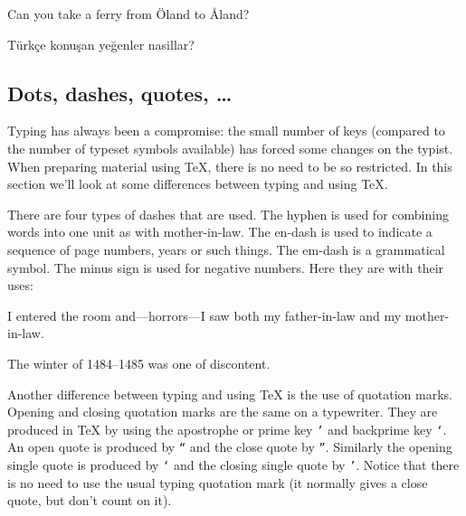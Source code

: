 \exercise Can you take a ferry from \"Oland to \AA land? 

\exercise T\"urk\c ce konu\c san ye\u genler nasillar? 


\def\bdots{\dots} %

\subsection{Dots, dashes, quotes, \bdots} 

Typing has always been a compromise: the small number of keys 
(compared to the number of typeset symbols available) has forced 
some changes on the typist.  When preparing material using \TeX{}, 
there is no need to be so restricted. In this section we'll look 
at some differences between typing and using \TeX\null. 

There are four types of dashes that are used.  The hyphen is used 
for combining words into one unit as with mother-in-law. 
The en-dash is used to indicate a sequence of page numbers, years 
or such things. The em-dash is a grammatical symbol.  The minus 
sign is used for negative numbers. Here they are with their uses: 


\exercise I entered the room and---horrors---I saw both my 
father-in-law and my mother-in-law. 

\exercise The winter of 1484--1485 was one of discontent. 
\bigskip 


Another difference between typing and using \TeX{} is the use of 
quotation marks.  Opening and closing quotation marks are the 
same on a typewriter.  They are produced in \TeX{} by using the 
apostrophe or prime key {\tt '} and backprime key {\tt `}\null. 
An open quote is produced by {\tt ``} and the 
close quote by {\tt ''}\null. Similarly the 
opening single quote is produced by {\tt `} and the closing 
single quote by {\tt '}\null. Notice that there is no need 
to use the usual typing quotation mark (it normally gives a close 
quote, but don't count on it). 

